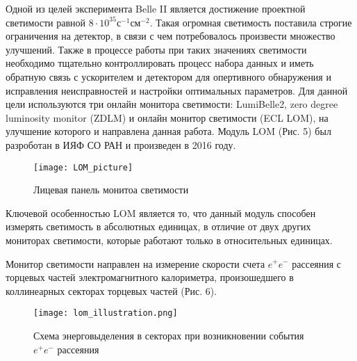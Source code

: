   Одной из целей эксперимента Belle II является достижение проектной светимости равной $8\cdot10^{35}$с$^{-1}$см$^{-2}$. Такая огромная светимость поставила строгие ограничения на детектор, в связи с чем потребовалось произвести множество улучшений. Также в процессе работы при таких значениях светимости необходимо тщательно контроллировать процесс набора данных и иметь обратную связь с ускорителем и детектором для опертивного обнаружения и исправления неисправностей и  настройки оптимальных параметров. Для данной цели используются три онлайн монитора светимости: LumiBelle2, zero degree luminosity monitor (ZDLM) и онлайн монитор светимости (ECL LOM), на улучшение которого и направлена данная работа. Модуль LOM (Рис. 5) был разроботан в ИЯФ СО РАН и произведен в 2016 году. 
\begin{figure}[htp]
  \centering
  \texttt{[image: LOM\_picture]}
  \caption{Лицевая панель монитоа светимости}
  \label{fig:galaxy}
\end{figure}
Ключевой особенностью LOM является то, что данный модуль способен измерять светимость в абсолютных единицах, в отличие от двух других мониторах светимости, которые работают только в относительных единицах.\par 
  Монитор светимости направлен на измерение скорости счета $e^+e^-$ рассеяния с торцевых частей электромагнитного калориметра, произошедшего в коллинеарных секторах торцевых частей (Рис. 6).
\begin{figure}[htp]
  \centering
  \texttt{[image: lom\_illustration.png]}
  \caption{Схема энерговыделения в секторах при возникновении события $e^+e^-$ рассеяния}
  \label{fig:galaxy}
\end{figure}
